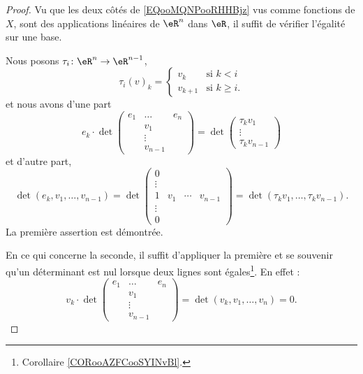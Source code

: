 \begin{proof}
    Vu que les deux côtés de \eqref{EQooMQNPooRHHBjz} vus comme fonctions de \( X\), sont des applications linéaires de \( \eR^n\) dans \( \eR\), il suffit de vérifier l'égalité sur une base.

    Nous posons \( \tau_i\colon \eR^n\to \eR^{n-1}\),
    \begin{equation}
        \tau_i(v)_k=\begin{cases}
            v_k    &   \text{si } k<i\\
            v_{k+1}    &    \text{si } k\geq i\text{.}
        \end{cases}
    \end{equation}
    et nous avons d'une part
    \begin{equation}
        e_k\cdot
                \det
                \begin{pmatrix}
                     e_1   &   \ldots    &   e_n    \\
                        &   v_1    &       \\
                        &   \vdots    &       \\
                        &   v_{n-1}    &
                 \end{pmatrix}
                 =\det\begin{pmatrix}
                     \tau_kv_1   \\
                     \vdots   \\
                     \tau_kv_{n-1}
                 \end{pmatrix}
            \end{equation}
     et d'autre part,
     \begin{equation}
         \det(e_k,v_1,\ldots, v_{n-1})=\det
         \begin{pmatrix}
             0&&&\\
             \vdots&&&\\
             1&v_1&\cdots&v_{n-1}\\
             \vdots&&&\\
             0&&&
         \end{pmatrix}=\det(\tau_k v_1,\ldots, \tau_k v_{n-1}).
     \end{equation}
     La première assertion est démontrée.

     En ce qui concerne la seconde, il suffit d'appliquer la première et se souvenir qu'un déterminant est nul lorsque deux lignes sont égales\footnote{Corollaire \ref{CORooAZFCooSYINvBl}.}. En effet :
     \begin{equation}
         v_k\cdot \det
                \begin{pmatrix}
                     e_1   &   \ldots    &   e_n    \\
                        &   v_1    &       \\
                        &   \vdots    &       \\
                        &   v_{n-1}    &
                 \end{pmatrix}
                 =
                 \det(v_k,v_1,\ldots, v_n)=0.
     \end{equation}
\end{proof}

